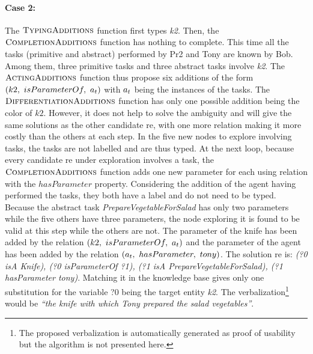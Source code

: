 \paragraph{Case 2:} The $\textsc{TypingAdditions}$ function first types \textit{k2}. Then, the $\textsc{CompletionAdditions}$ function has nothing to complete. This time all the tasks (primitive and abstract) performed by Pr2 and Tony are known by Bob. Among them, three primitive tasks and three abstract tasks involve \textit{k2}. The $\textsc{ActingAdditions}$ function thus propose six additions of the form $(k2,\ isParameterOf,\ \indiv_t)$ with $a_t$ being the instances of the tasks. The $\textsc{DifferentiationAdditions}$ function has only one possible addition being the color of $k2$. However, it does not help to solve the ambiguity and will give the same solutions as the other candidate \acrshort{re}, with one more relation making it more costly than the others at each step. In the five new nodes to explore involving tasks, the tasks are not labelled and are thus typed. At the next loop, because every candidate \acrshort{re} under exploration involves a task, the $\textsc{CompletionAdditions}$ function adds one new parameter for each using relation with the $hasParameter$ property. Considering the addition of the agent having performed the tasks, they both have a label and do not need to be typed. Because the abstract task \textit{PrepareVegetableForSalad} has only two parameters while the five others have three parameters, the node exploring it is found to be valid at this step while the others are not. The parameter of the knife has been added by the relation $(k2,\ isParameterOf,\ \indiv_t)$ and the parameter of the agent has been added by the relation $(a_t,\ hasParameter,\ tony)$. The solution \acrshort{re} is: \textit{(?0 isA Knife), (?0 isParameterOf ?1), (?1 isA PrepareVegetableForSalad), (?1 hasParameter tony)}. Matching it in the knowledge base gives only one substitution for the variable ?0 being the target entity \textit{k2}. The verbalization\footnote{The proposed verbalization is automatically generated as proof of usability but the algorithm is not presented here.} would be \textit{``the knife with which Tony prepared the salad vegetables''}.

